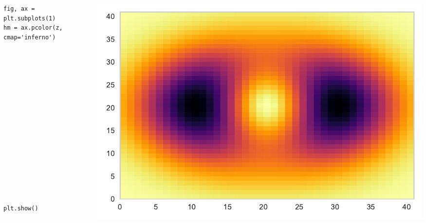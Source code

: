 \documentclass{beamer}
\begin{document}
\begin{frame}[fragile]
\tiny{
\begin{columns}
\begin{column}{0.45\textwidth}
\begin{verbatim}
fig, ax = plt.subplots(1)
hm = ax.pcolor(z, cmap='inferno')

















plt.show()
\end{verbatim}
\end{column}
\begin{column}{0.55\textwidth}
\includegraphics[width=\textwidth]{heatmap_2.pdf}
\end{column}
\end{columns}
}
\end{frame}
\end{document}
